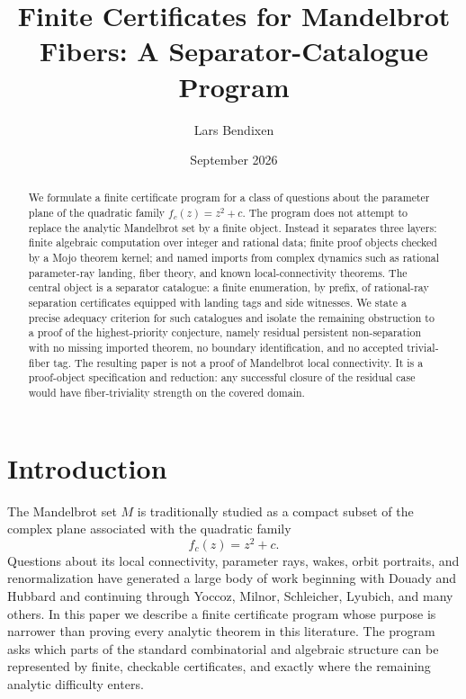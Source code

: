 \documentclass[11pt]{amsart}
\title[Finite Certificates for Mandelbrot Fibers]{Finite Certificates for Mandelbrot Fibers: A Separator-Catalogue Program}
\author{Lars Bendixen}
\date{September 2026}
\begin{document}
\begin{abstract}
We formulate a finite certificate program for a class of questions about the parameter plane of the quadratic family \(f_c(z)=z^2+c\).  The program does not attempt to replace the analytic Mandelbrot set by a finite object.  Instead it separates three layers: finite algebraic computation over integer and rational data; finite proof objects checked by a Mojo theorem kernel; and named imports from complex dynamics such as rational parameter-ray landing, fiber theory, and known local-connectivity theorems.  The central object is a separator catalogue: a finite enumeration, by prefix, of rational-ray separation certificates equipped with landing tags and side witnesses.  We state a precise adequacy criterion for such catalogues and isolate the remaining obstruction to a proof of the highest-priority conjecture, namely residual persistent non-separation with no missing imported theorem, no boundary identification, and no accepted trivial-fiber tag.  The resulting paper is not a proof of Mandelbrot local connectivity.  It is a proof-object specification and reduction: any successful closure of the residual case would have fiber-triviality strength on the covered domain.
\end{abstract}

\maketitle

\tableofcontents

\section{Introduction}

The Mandelbrot set \(M\) is traditionally studied as a compact subset of the complex plane associated with the quadratic family
\[
        f_c(z)=z^2+c.
\]
Questions about its local connectivity, parameter rays, wakes, orbit portraits, and renormalization have generated a large body of work beginning with Douady and Hubbard and continuing through Yoccoz, Milnor, Schleicher, Lyubich, and many others.  In this paper we describe a finite certificate program whose purpose is narrower than proving every analytic theorem in this literature.  The program asks which parts of the standard combinatorial and algebraic structure can be represented by finite, checkable certificates, and exactly where the remaining analytic difficulty enters.
\end{document}
